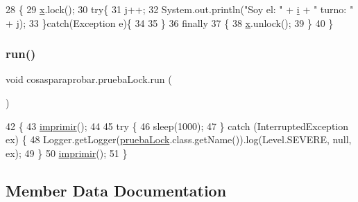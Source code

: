 \begin{DoxyCode}
28     \{
29         \mbox{\hyperlink{classcosasparaprobar_1_1prueba_lock_acc25c3cf5a84e4663118437986227e03}{x}}.lock();
30         \textcolor{keywordflow}{try}\{
31         \mbox{\hyperlink{classcosasparaprobar_1_1prueba_lock_ad8aaf12f51650b7b83e28512af4bf831}{j}}++;
32         System.out.println(\textcolor{stringliteral}{"Soy el: "} + \mbox{\hyperlink{classcosasparaprobar_1_1prueba_lock_a09994290f41e771d38e58b3fa49a2423}{i}} + \textcolor{stringliteral}{" turno: "} + \mbox{\hyperlink{classcosasparaprobar_1_1prueba_lock_ad8aaf12f51650b7b83e28512af4bf831}{j}});
33         \}\textcolor{keywordflow}{catch}(Exception e)\{
34             
35         \}
36         \textcolor{keywordflow}{finally}
37         \{
38             \mbox{\hyperlink{classcosasparaprobar_1_1prueba_lock_acc25c3cf5a84e4663118437986227e03}{x}}.unlock();
39         \}
40     \}
\end{DoxyCode}
\mbox{\label{classcosasparaprobar_1_1prueba_lock_abb5d8bc76365e77760daec389ab86b2e}} 
\subsubsection{\texorpdfstring{run()}{run()}}
{\footnotesize\ttfamily void cosasparaprobar.\+prueba\+Lock.\+run (\begin{DoxyParamCaption}{ }\end{DoxyParamCaption})\hspace{0.3cm}{\ttfamily [inline]}}


\begin{DoxyCode}
42                      \{
43         \mbox{\hyperlink{classcosasparaprobar_1_1prueba_lock_aec34354c84889e047b1c06ed12cdebe8}{imprimir}}();
44         
45         \textcolor{keywordflow}{try} \{
46             sleep(1000);
47         \} \textcolor{keywordflow}{catch} (InterruptedException ex) \{
48             Logger.getLogger(\mbox{\hyperlink{classcosasparaprobar_1_1prueba_lock_af5d0c268d078ba0b6d6a8ffec9c6ce26}{pruebaLock}}.class.getName()).log(Level.SEVERE, null, ex);
49         \}
50         \mbox{\hyperlink{classcosasparaprobar_1_1prueba_lock_aec34354c84889e047b1c06ed12cdebe8}{imprimir}}();
51     \}
\end{DoxyCode}


\subsection{Member Data Documentation}
\mbox{\label{classcosasparaprobar_1_1prueba_lock_a09994290f41e771d38e58b3fa49a2423}} 
